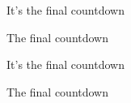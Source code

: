 \begin{song}
\bigskip

It’s the final countdown    \par
The final countdown    \par
{}     \par

\bigskip

It’s the final countdown    \par
The final countdown    \par
{}     \par
{} \par

\end{song}
